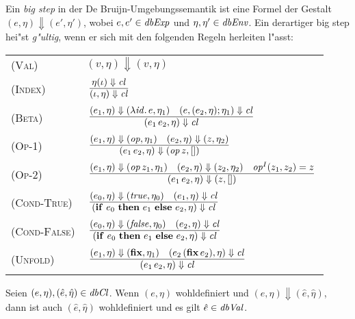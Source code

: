\documentclass[12pt,fleqn]{article}
\newcommand{\RN}[1]{\mbox{\textsc{(#1)}}}
\newcommand{\cl}{\name{cl}}
\begin{document}
\begin{definition}
Ein {\em big step} in der De Bruijn-Umgebungssemantik ist eine Formel der Gestalt $(e,\eta) \Downarrow (e',\eta')$,
wobei $e,e'\in{\text{\it dbExp\/}}$ und $\eta,\eta'\in{\text{\it dbEnv\/}}$. Ein derartiger big step hei"st {\em g"ultig}, wenn er sich mit den
folgenden Regeln herleiten l"asst: \\[5mm]
\begin{tabular}{ll}
  \RN{Val}        & $(v,\eta) \Downarrow (v,\eta)$ \\[3mm]
  \RN{Index}      & $\regel{\eta(\iota) \Downarrow \cl}
                           {(\iota,\eta) \Downarrow \cl}$ \\[3mm]
  \RN{Beta}       & $\regel{(e_1,\eta) \Downarrow (\abstr{\id}{e},\eta_1)
                            \quad (e,(e_2,\eta);\eta_1) \Downarrow \cl}
                           {(\app{e_1}{e_2},\eta) \Downarrow \cl}$ \\[3mm]
  \RN{Op-1}       & $\regel{(e_1,\eta) \Downarrow (\op,\eta_1) \quad (e_2,\eta) \Downarrow (z,\eta_2)}
                           {(\app{e_1}{e_2},\eta) \Downarrow (\app{\op}{z},[])}$ \\[3mm]
  \RN{Op-2}       & $\regel{(e_1,\eta) \Downarrow (\app{\op}{z_1},\eta_1)
                            \quad (e_2,\eta) \Downarrow (z_2,\eta_2)
                            \quad \op^I(z_1,z_2) = z}
                           {(\app{e_1}{e_2},\eta) \Downarrow (z,[])}$ \\[3mm]
  \RN{Cond-True}  & $\regel{(e_0,\eta) \Downarrow (\true,\eta_0) \quad (e_1,\eta) \Downarrow \cl}
                           {(\bifte{e_0}{e_1}{e_2},\eta) \Downarrow \cl}$ \\[3mm]
  \RN{Cond-False} & $\regel{(e_0,\eta) \Downarrow (\false,\eta_0) \quad (e_2,\eta) \Downarrow \cl}
                           {(\bifte{e_0}{e_1}{e_2},\eta) \Downarrow \cl}$ \\[3mm]
  \RN{Unfold}     & $\regel{(e_1,\eta) \Downarrow (\bfix,\eta_1)
                            \quad (\app{e_2}{(\app{\bfix}{e_2})},\eta) \Downarrow \cl}
                           {(\app{e_1}{e_2},\eta) \Downarrow \cl}$
\end{tabular}
\end{definition}

\begin{lemma}
  Seien $(e,\eta),(\hat{e},\hat{\eta})\in{\text{\it dbCl\/}}$. Wenn $(e,\eta)$ wohldefiniert und
  $(e,\eta) \Downarrow (\hat{e},\hat{\eta})$, dann ist auch $(\hat{e},\hat{\eta})$
  wohldefiniert und es gilt $\hat{e}\in{\text{\it dbVal\/}}$.
\end{lemma}
\end{document}
